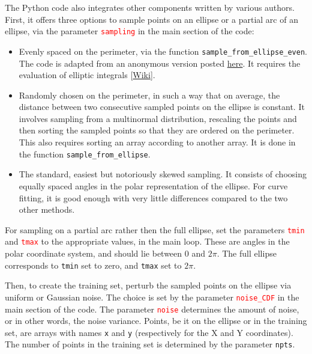 \documentclass[oneside,10pt]{book}
\begin{document}
\noindent The Python code also integrates other components written by various authors. First, it offers three options to sample points on an ellipse or a partial arc of an ellipse, via the parameter \textcolor{red}{\texttt{sampling}} in the main section of the code:
\begin{itemize}
\item Evenly spaced on the perimeter, via the function \texttt{sample\_from\_ellipse\_even}. The code is adapted from an anonymous version posted
\href{https://math.stackexchange.com/questions/3710402/generate-random-points-on-perimeter-of-ellipse}{here}. It requires the evaluation of
 \textcolor{index}{elliptic integrals} [\href{https://en.wikipedia.org/wiki/Elliptic_integral}{Wiki}].
\item Randomly chosen on the perimeter, in such a way that on average, the distance between two consecutive sampled points on the ellipse is constant.
 It involves sampling from a multinormal distribution, rescaling the points and then sorting the sampled points so that they are ordered on the perimeter. This
 also requires sorting an array according to another array.  It is done in the function
 \texttt{sample\_from\_ellipse}.
\item The standard, easiest but notoriously skewed sampling. It consists of choosing equally spaced angles in the polar representation of the ellipse. For curve fitting, it is good enough with very little differences compared to the two other methods.
\end{itemize}

\noindent For sampling on a partial arc rather then the full ellipse, set the parameters
\textcolor{red}{\texttt{tmin}} and \textcolor{red}{\texttt{tmax}} to the appropriate values, in the main loop.
These are angles in the polar coordinate system, and should lie between $0$ and $2\pi$. The full ellipse corresponds to
 \texttt{tmin} set to zero, and \texttt{tmax} set to $2\pi$. \vspace{1ex}

\vspace{1ex}

\noindent Then, to create the training set, perturb the sampled points on the ellipse via uniform or Gaussian noise.
 The choice is set by the parameter \textcolor{red}{\texttt{noise\_CDF}} in the main section of the code. The parameter
\textcolor{red}{\texttt{noise}} determines the amount of noise, or in other words, the noise variance. Points, be it on the ellipse or in the training set,
 are arrays with names \texttt{x} and \texttt{y} (respectively for the X and Y coordinates). The number of points in the  training set is determined
 by the parameter \textcolor{index}{\texttt{npts}}.
\end{document}

